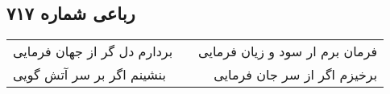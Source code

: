 \begin{center}
\section*{رباعی شماره ۷۱۷}
\label{sec:sh717}
\begin{longtable}{l p{0.5cm} r}
بردارم دل گر از جهان فرمایی
&&
فرمان برم ار سود و زیان فرمایی
\\
بنشینم اگر بر سر آتش گویی
&&
برخیزم اگر از سر جان فرمایی
\\
\end{longtable}
\end{center}
